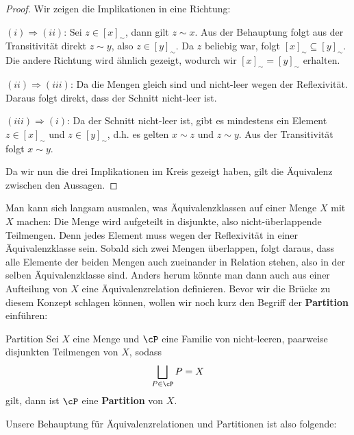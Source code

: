 \begin{proof} Wir zeigen die Implikationen in eine Richtung:

$(i) \Longrightarrow (ii)$: Sei $z \in [x]_\sim$, dann gilt $z\sim x$. Aus der Behauptung folgt aus der Transitivität direkt $z \sim y$, also $z \in [y]_\sim$. Da $z$ beliebig war, folgt $[x]_\sim \subseteq [y]_\sim$. Die andere Richtung wird ähnlich gezeigt, wodurch wir $[x]_\sim = [y]_\sim$ erhalten.

$(ii) \Longrightarrow (iii)$: Da die Mengen gleich sind und nicht-leer wegen der Reflexivität. Daraus folgt direkt, dass der Schnitt nicht-leer ist.

$(iii) \Longrightarrow (i)$: Da der Schnitt nicht-leer ist, gibt es mindestens ein Element $z \in [x]_\sim$ und $z \in [y]_\sim$, d.h. es gelten $x \sim z$ und $z \sim y$. Aus der Transitivität folgt $x \sim y$.

Da wir nun die drei Implikationen im Kreis gezeigt haben, gilt die Äquivalenz zwischen den Aussagen.
\end{proof}

Man kann sich langsam ausmalen, was Äquivalenzklassen auf einer Menge $X$ mit $X$ machen: Die Menge wird aufgeteilt in disjunkte, also nicht-überlappende Teilmengen. Denn jedes Element muss wegen der Reflexivität in einer Äquivalenzklasse sein. Sobald sich zwei Mengen überlappen, folgt daraus, dass alle Elemente der beiden Mengen auch zueinander in Relation stehen, also in der selben Äquivalenzklasse sind. Anders herum könnte man dann auch aus einer Aufteilung von $X$ eine Äquivalenzrelation definieren. Bevor wir die Brücke zu diesem Konzept schlagen können, wollen wir noch kurz den Begriff der \textbf{Partition} einführen:

\begin{definition}{Partition}{}
Sei $X$ eine Menge und $\cP$ eine Familie von nicht-leeren, paarweise disjunkten Teilmengen von $X$, sodass
$$\bigsqcup_{P \in \cP}P = X$$
gilt, dann ist $\cP$ eine \textbf{Partition} von $X$.
\end{definition}

Unsere Behauptung für Äquivalenzrelationen und Partitionen ist also folgende:

